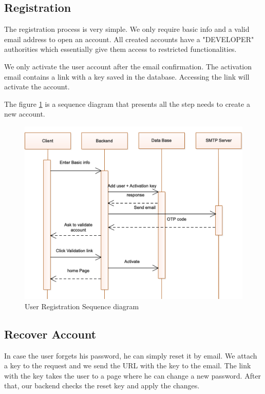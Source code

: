 \begin{spacing}{1.2}
\subsection{Registration}
The registration process is very simple. We only require basic info and a valid email address to open an account. All created accounts have a "DEVELOPER" authorities which essentially give them access to restricted functionalities.

We only activate the user account after the email confirmation. The activation email contains a link with a key saved in the database. Accessing the link will activate the account.

The figure \ref{fig:register} is a sequence diagram that presents all the step needs to create a new account.

\begin{figure}[H]\centering
\includegraphics[scale=0.8]{Register_user_sequence_diagram.png}
\caption{User Registration Sequence diagram}
\label{fig:register}
\end{figure}



\subsection{Recover Account}
In case the user forgets his password, he can simply reset it by email. We attach a key to the request and we send the URL with the key to the email. The link with the key takes the user to a page where he can change a new password. After that, our backend checks the reset key and apply the changes.


\end{spacing}

